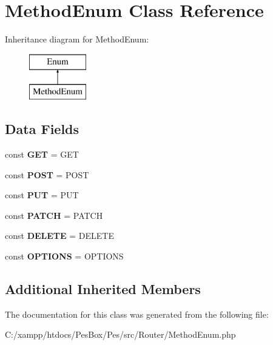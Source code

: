 \hypertarget{class_pes_1_1_router_1_1_method_enum}{}\section{Method\+Enum Class Reference}
\label{class_pes_1_1_router_1_1_method_enum}
Inheritance diagram for Method\+Enum\+:\begin{figure}[H]
\begin{center}
\leavevmode
\includegraphics[height=2.000000cm]{class_pes_1_1_router_1_1_method_enum}
\end{center}
\end{figure}
\subsection*{Data Fields}
\begin{DoxyCompactItemize}
\item 
\mbox{\label{class_pes_1_1_router_1_1_method_enum_a036e3adfeab59b468951a7ebb383f953}} 
const {\bfseries G\+ET} = \textquotesingle{}G\+ET\textquotesingle{}
\item 
\mbox{\label{class_pes_1_1_router_1_1_method_enum_a266e25cc4bc4d1fc753aede118504cf9}} 
const {\bfseries P\+O\+ST} = \textquotesingle{}P\+O\+ST\textquotesingle{}
\item 
\mbox{\label{class_pes_1_1_router_1_1_method_enum_a23b57ba9951f93047ebb64d9f924ff74}} 
const {\bfseries P\+UT} = \textquotesingle{}P\+UT\textquotesingle{}
\item 
\mbox{\label{class_pes_1_1_router_1_1_method_enum_afc5eb92d4983d65b4550de83fe3c39f9}} 
const {\bfseries P\+A\+T\+CH} = \textquotesingle{}P\+A\+T\+CH\textquotesingle{}
\item 
\mbox{\label{class_pes_1_1_router_1_1_method_enum_a614b5d84fb7b22aa1dfde34cf7b8f1ff}} 
const {\bfseries D\+E\+L\+E\+TE} = \textquotesingle{}D\+E\+L\+E\+TE\textquotesingle{}
\item 
\mbox{\label{class_pes_1_1_router_1_1_method_enum_ad7a0cb2592aa45dd08251b948d43f1d6}} 
const {\bfseries O\+P\+T\+I\+O\+NS} = \textquotesingle{}O\+P\+T\+I\+O\+NS\textquotesingle{}
\end{DoxyCompactItemize}
\subsection*{Additional Inherited Members}


The documentation for this class was generated from the following file\+:\begin{DoxyCompactItemize}
\item 
C\+:/xampp/htdocs/\+Pes\+Box/\+Pes/src/\+Router/Method\+Enum.\+php\end{DoxyCompactItemize}
